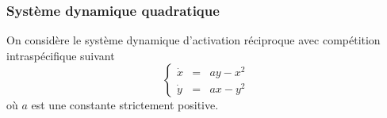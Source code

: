 \subsubsection{Système dynamique quadratique} \label{SystDyn-Quadratique}

On considère le système dynamique d’activation réciproque avec compétition intraspécifique suivant 
$$
\left\{\begin{array}{rcl}
        \dot x & = & a y - x^2 \\ 
        \dot y & = & a x - y^2 
        \end{array}\right.
$$
où $a$ est une constante strictement positive.
